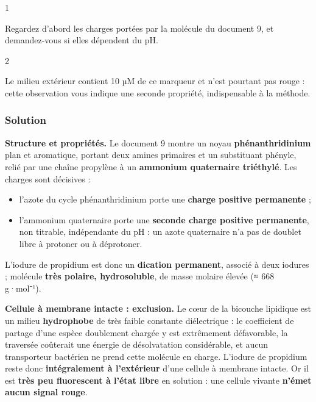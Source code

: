 \documentclass[11pt,a4paper]{article}
\providecommand{\tightlist}{\setlength{\itemsep}{0pt}\setlength{\parskip}{0pt}}
\begin{document}
\begin{indication}{1}

Regardez d'abord les charges portées par la molécule du document 9, et demandez-vous si elles dépendent du pH.

\end{indication}

\begin{indication}{2}

Le milieu extérieur contient 10 µM de ce marqueur et n'est pourtant pas rouge : cette observation vous indique une seconde propriété, indispensable à la méthode.

\end{indication}

\hypertarget{solution-22}{%
\subsubsection{Solution}\label{solution-22}}

\textbf{Structure et propriétés.} Le document 9 montre un noyau \textbf{phénanthridinium} plan et aromatique, portant deux amines primaires et un substituant phényle, relié par une chaîne propylène à un \textbf{ammonium quaternaire triéthylé}. Les charges sont décisives :

\begin{itemize}
\tightlist
\item
  l'azote du cycle phénanthridinium porte une \textbf{charge positive permanente} ;
\item
  l'ammonium quaternaire porte une \textbf{seconde charge positive permanente}, non titrable, indépendante du pH : un azote quaternaire n'a pas de doublet libre à protoner ou à déprotoner.
\end{itemize}

L'iodure de propidium est donc un \textbf{dication permanent}, associé à deux iodures ; molécule \textbf{très polaire, hydrosoluble}, de masse molaire élevée (≈ 668 g·mol⁻¹).

\textbf{Cellule à membrane intacte : exclusion.} Le cœur de la bicouche lipidique est un milieu \textbf{hydrophobe} de très faible constante diélectrique : le coefficient de partage d'une espèce doublement chargée y est extrêmement défavorable, la traversée coûterait une énergie de désolvatation considérable, et aucun transporteur bactérien ne prend cette molécule en charge. L'iodure de propidium reste donc \textbf{intégralement à l'extérieur} d'une cellule à membrane intacte. Or il est \textbf{très peu fluorescent à l'état libre} en solution : une cellule vivante \textbf{n'émet aucun signal rouge}.
\end{document}
